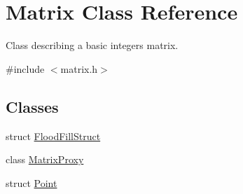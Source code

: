 \hypertarget{classMatrix}{
\section{Matrix Class Reference}
\label{classMatrix}
}


Class describing a basic integers matrix.  




{\ttfamily \#include $<$matrix.h$>$}

\subsection*{Classes}
\begin{DoxyCompactItemize}
\item 
struct \hyperlink{structMatrix_1_1FloodFillStruct}{FloodFillStruct}
\item 
class \hyperlink{classMatrix_1_1MatrixProxy}{MatrixProxy}
\item 
struct \hyperlink{structMatrix_1_1Point}{Point}
\end{DoxyCompactItemize}
